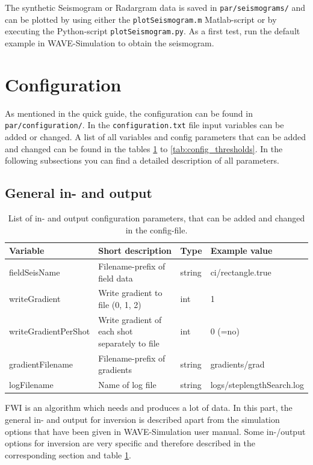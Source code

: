 \documentclass[pdftex,a4paper,parskip,listof=totoc,bibliography=totoc,onehalfspacing,12pt]{scrreprt}
\newcommand{\shellcmd}[1]{\indent\indent\texttt{#1}}	%
\begin{document}
The synthetic Seismogram or Radargram data is saved in \shellcmd{par/seismograms/} and can be plotted by using either the \shellcmd{plotSeismogram.m} Matlab-script or by executing the Python-script \shellcmd{plotSeismogram.py}.
As a first test, run the default example in WAVE-Simulation to obtain the seismogram. 


\section{Configuration}
\label{sec:config}
As mentioned in the quick guide, the configuration can be found in \shellcmd{par/configuration/}. In the \shellcmd{configuration.txt} file input variables can be added or changed. A list of all variables and config parameters that can be added and changed can be found in the tables \ref{tab:config_IO} to \ref{tab:config_thresholds}. In the following subsections you can find a detailed description of all parameters.

\subsection{General in- and output}
\begin{table}[h!]
\caption[List of in- and output configuration parameters.]{List of in- and output configuration parameters, that can be added and changed in the config-file.}\label{tab:config_IO}
\centering
\begin{adjustbox}{width=1\textwidth,center=\textwidth}
	\begin{tabular}{llll}
	\toprule
         Variable                 & Short description                                                   & Type   & Example value \\
	\midrule
         fieldSeisName            & Filename-prefix of field data                                                  & string & ci/rectangle.true  \\    
         writeGradient            & Write gradient to file (0, 1, 2)                                             &  int   & 1 \\
         writeGradientPerShot     & Write gradient of each shot separately to file                      &  int   & 0 (=no) \\
         gradientFilename         & Filename-prefix of gradients                                                   & string & gradients/grad \\     
         logFilename              & Name of log file                                                    & string & logs/steplengthSearch.log  \\
	\bottomrule
	\end{tabular}
	\end{adjustbox}
\end{table}
FWI is an algorithm which needs and produces a lot of data. In this part, the general in- and output for inversion is described apart from the simulation options that have been given in WAVE-Simulation user manual. Some in-/output options for inversion are very specific and therefore described in the corresponding section and table \ref{tab:config_IO}.
\end{document}
